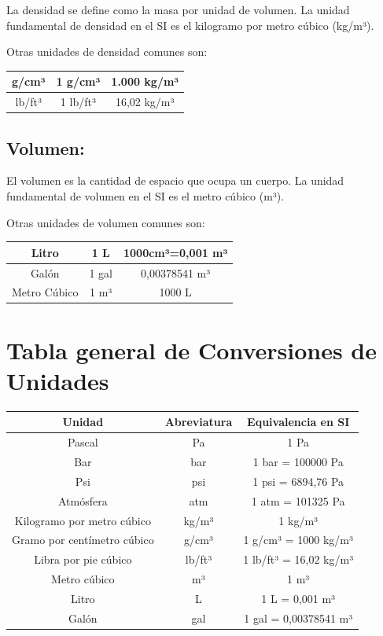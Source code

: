 \documentclass[../main]{subfiles}
\begin{document}
La densidad se define como la masa por unidad de volumen. La unidad
fundamental de densidad en el SI es el kilogramo por metro cúbico (kg/m³).

Otras unidades de densidad comunes son:
\begin{table}[ht!]
  \centering
  \begin{tabular}{|c|c|c|} \hline
    g/cm³ &1 g/cm³ & 1.000 kg/m³\\ \hline
    lb/ft³ &1 lb/ft³ &16,02 kg/m³\\ \hline
  \end{tabular}

\end{table}

\subsection{Volumen:}

El volumen es la cantidad de espacio que ocupa un cuerpo. La unidad
fundamental de volumen en el SI es el metro cúbico (m³).

Otras unidades de volumen comunes son:

\begin{table}[ht!]
  \centering
  \begin{tabular}{|c|c|c|} \hline
    Litro & 1 L & 1000cm³=0,001 m³ \\ \hline
    Galón & 1 gal & 0,00378541 m³\\ \hline
    Metro Cúbico & 1 m³ & 1000 L \\ \hline
  \end{tabular}
\end{table}
\section{Tabla general de Conversiones de Unidades}
\begin{center}
  \begin{tabular}{|c|c|c|}
    \hline
    \textbf{Unidad} & \textbf{Abreviatura} & \textbf{Equivalencia en
    SI} \\ \hline
    Pascal & Pa & 1 Pa \\ \hline
    Bar & bar & 1 bar = 100000 Pa \\ \hline
    Psi & psi & 1 psi = 6894,76 Pa \\ \hline
    Atmósfera & atm & 1 atm = 101325 Pa \\ \hline
    Kilogramo por metro cúbico & kg/m³ & 1 kg/m³ \\ \hline
    Gramo por centímetro cúbico & g/cm³ & 1 g/cm³ = 1000 kg/m³ \\ \hline
    Libra por pie cúbico & lb/ft³ & 1 lb/ft³ = 16,02 kg/m³ \\ \hline
    Metro cúbico & m³ & 1 m³ \\ \hline
    Litro & L & 1 L = 0,001 m³ \\ \hline
    Galón & gal & 1 gal = 0,00378541 m³ \\ \hline
  \end{tabular}
\end{center}
\end{document}
